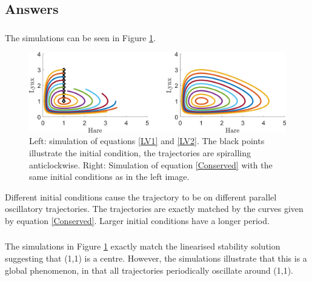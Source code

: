 \documentclass[]{article}
\newcommand{\fig}[1]{Figure \ref{#1}}
\newcommand{\eqn}[1]{equation \eqref{#1}}
\newcommand{\eqns}[2]{equations \eqref{#1} and \eqref{#2}}
\begin{document}
\begin{Answ}
\subsection{Answers}
\subsubsection{}
The simulations can be seen in \fig{LV_sims}.
\begin{figure}[h!!!tb]
\centering
\includegraphics[width=\textwidth]{../../Pictures/LV_sims.png}
\caption{Left: simulation of \eqns{LV1}{LV2}. The black points illustrate the initial condition, the trajectories are spiralling anticlockwise. Right: Simulation of \eqn{Conserved} with the same initial conditions as in the left image.\label{LV_sims}}
\end{figure}
Different initial conditions cause the trajectory to be on different parallel oscillatory trajectories. The trajectories are exactly matched by the curves given by \eqn{Conserved}. Larger initial conditions have a longer period.

\subsubsection{}
The simulations in \fig{LV_sims} exactly match the linearised stability solution suggesting that (1,1) is a centre. However, the simulations illustrate that this is a global phenomenon, in that all trajectories periodically oscillate around (1,1).

\end{Answ}
\end{document}

